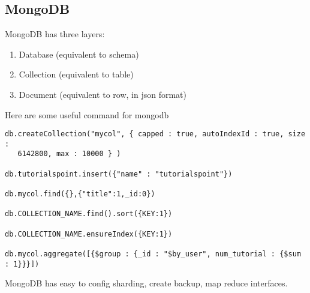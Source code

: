 \subsection{MongoDB}

MongoDB has three layers:
\begin{enumerate}
\item Database (equivalent to schema)
\item Collection (equivalent to table)
\item Document (equivalent to row, in json format)
\end{enumerate}

Here are some useful command for mongodb
\begin{lstlisting}
db.createCollection("mycol", { capped : true, autoIndexId : true, size :
   6142800, max : 10000 } )

db.tutorialspoint.insert({"name" : "tutorialspoint"})

db.mycol.find({},{"title":1,_id:0})

db.COLLECTION_NAME.find().sort({KEY:1})

db.COLLECTION_NAME.ensureIndex({KEY:1})

db.mycol.aggregate([{$group : {_id : "$by_user", num_tutorial : {$sum : 1}}}])
\end{lstlisting}

MongoDB has easy to config sharding, create backup, map reduce interfaces.
